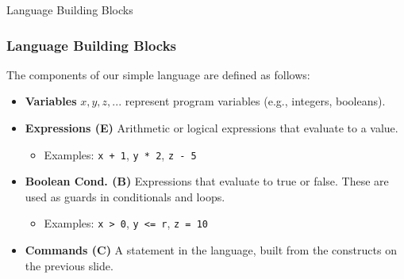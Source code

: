 \documentclass[aspectratio=169]{beamer}
\newcommand{\code}[1]{\lstinline|#1|}
\begin{document}
\begin{frame}{Language Building Blocks}
    \frametitle{Language Building Blocks}
    The components of our simple language are defined as follows:
    
    \begin{itemize}
        \item \textbf{Variables} $x, y, z, ...$ represent program variables (e.g., integers, booleans).
        
        \pause
        \item \textbf{Expressions (E)} Arithmetic or logical expressions that evaluate to a value.
        \begin{itemize}
            \item Examples: \code{x + 1}, \code{y * 2}, \code{z - 5}
        \end{itemize}
        
        \pause
        \item\textbf{Boolean Cond. (B)} Expressions that evaluate to true or false. These are used as guards in conditionals and loops.
        \begin{itemize}
            \item Examples: \code{x > 0}, \code{y <= r}, \code{z = 10}
        \end{itemize}
        
        \pause
        \item \textbf{Commands (C)} A statement in the language, built from the constructs on the previous slide.
    \end{itemize}
\end{frame}
\end{document}
